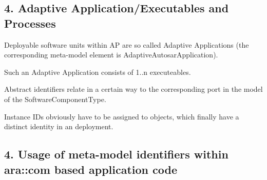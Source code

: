 \subsection*{4. Adaptive Application/\+Executables and Processes}


\begin{DoxyItemize}
\item Deployable software units within AP are so called Adaptive Applications (the corresponding meta-\/model element is Adaptive\+Autosar\+Application).
\item Such an Adaptive Application consists of 1..n executeables. 
\item Abstract identifiers relate in a certain way to the corresponding port in the model of the Software\+Component\+Type.
\item Instance I\+Ds obviously have to be assigned to objects, which finally have a distinct identity in an deployment. 
\end{DoxyItemize}

\subsection*{4. Usage of meta-\/model identifiers within ara\+::com based application code}


